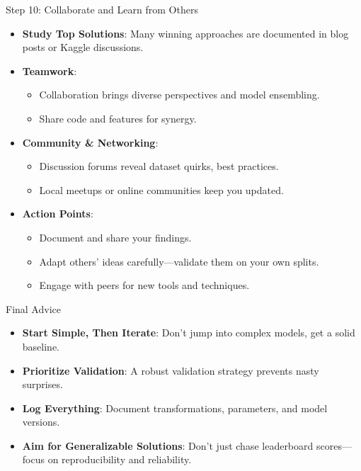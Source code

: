 \documentclass[ignorenonframetext,]{beamer}
\begin{document}
\begin{frame}{Step 10: Collaborate and Learn from Others}
\begin{itemize}
  \item \textbf{Study Top Solutions}: Many winning approaches are documented in blog posts or Kaggle discussions.
  \item \textbf{Teamwork}:
    \begin{itemize}
      \item Collaboration brings diverse perspectives and model ensembling.
      \item Share code and features for synergy.
    \end{itemize}
  \item \textbf{Community \& Networking}:
    \begin{itemize}
      \item Discussion forums reveal dataset quirks, best practices.
      \item Local meetups or online communities keep you updated.
    \end{itemize}
  \item \textbf{Action Points}:
    \begin{itemize}
      \item Document and share your findings.
      \item Adapt others’ ideas carefully—validate them on your own splits.
      \item Engage with peers for new tools and techniques.
    \end{itemize}
\end{itemize}
\end{frame}

\begin{frame}{Final Advice}
\begin{itemize}
  \item \textbf{Start Simple, Then Iterate}: Don’t jump into complex models, get a solid baseline.
  \item \textbf{Prioritize Validation}: A robust validation strategy prevents nasty surprises.
  \item \textbf{Log Everything}: Document transformations, parameters, and model versions.
  \item \textbf{Aim for Generalizable Solutions}: Don’t just chase leaderboard scores—focus on reproducibility and reliability.
\end{itemize}
\end{frame}
\end{document}
